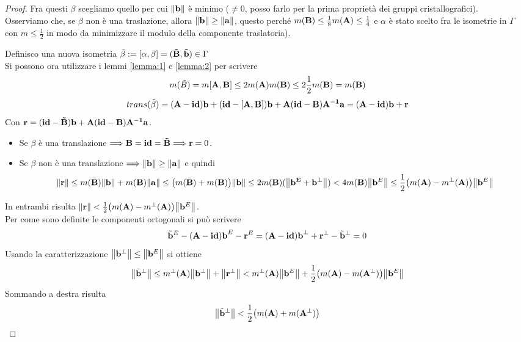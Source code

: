 \documentclass[a4paper,11pt,openright,twoside	]{book}
\begin{document}
\begin{proof}
Fra questi $\beta$ scegliamo quello per cui $\norm{\vb{b}}$ è minimo ($\neq 0$, posso farlo per la prima proprietà dei gruppi cristallografici). \\
Osserviamo che, se $\beta$ non è una traslazione, allora $ \norm{\vb{b}} \geq \norm{\vb{a}}$, questo perché $m(\vb{B}) \leq \frac{1}{8}m(\vb{A}) \leq \frac{1}{4}$ e $\alpha$ è stato scelto fra le isometrie in $\Gamma$ con $m \leq \frac{1}{2}$ in modo da minimizzare il modulo della componente traslatoria).  





Definisco una nuova isometria $ \tilde{\beta} := [\vb{\alpha,\beta}] = (\vb{\tilde{B}, \tilde{b}})\in \Gamma$  \\
Si possono ora utilizzare i lemmi \ref{lemma:1} e \ref{lemma:2} per scrivere 
\[ m(\tilde{B} ) = m[\vb{A,B}] \leq 2m(\vb{A}) m(\vb{B}) \leq 2 \frac{1}{2}m(\vb{B}) = m(\vb{B}) \]
\[ trans( \tilde{\beta}) = \vb{(A-id)b + (id-[A,B])b + A(id-B)A^{-1}a} = \vb{(A-id)b + r}\]
Con $\vb{r} = \vb{(id-\tilde{B})b + A(id-B)A^{-1}a}$.
\begin{itemize}
\item Se $\beta$  è una translazione $\Longrightarrow \vb{B = id = \tilde{B}} \Longrightarrow \vb{r} = 0$. 
\item Se $\beta$ non è una translazione $\Longrightarrow \norm{\vb{b}} \geq \norm{\vb{a}}$  e quindi \\
\[ \norm{\vb{r}} \leq m(\tilde{\vb{B}}) \norm{\vb{b}} + m(\vb{B}) \norm{\vb{a}} \leq \big( m(\tilde{\vb{B}}) + m(\vb{B}) \big) \norm{\vb{b}} \leq 2m(\vb{B})(\norm{\vb{b^{E}+ b^{\perp}}}) < 4 m(\vb{B}) \norm{\vb{b}^{E}} \leq \frac{1}{2} \big( m(\vb{A}) - m^{\perp}(\vb{A}) \big)\norm{\vb{b}^{E}} \]
\end{itemize}
In entrambi risulta $\norm{\vb{r}} < \frac{1}{2} \big( m(\vb{A}) - m^{\perp}(\vb{A}) \big)\norm{\vb{b}^{E}}$. \\
Per come sono definite le componenti ortogonali si può scrivere
\[ \tilde{\vb{b}}^{E} -(\vb{A-id) b}^{E} - \vb{r}^{E} = (\vb{A-id) b}^{\perp} + \vb{r}^{\perp} - \tilde{\vb{b}}^{\perp} = 0 \]
Usando la caratterizzazione $\norm{\vb{b}^{\perp}} \leq \norm{\vb{b}^E}$ si ottiene
\[ \norm{\tilde{\vb{b}}^{\perp}} \leq  m^{\perp}(\vb{A}) \norm{\vb{b}^{\perp}} + \norm{\vb{r}^{\perp}} < m^{\perp}(\vb{A}) \norm{\vb{b}^{E}} + \frac{1}{2} \big( m(\vb{A}) - m(\vb{A}^{\perp}) \big)\norm{\vb{b}^{E}}  \] 
Sommando a destra risulta
\[ \norm{\tilde{\vb{b}}^{\perp}} < \frac{1}{2} \big( m(\vb{A}) + m(\vb{A}^{\perp}) \big) \]

\end{proof}
\end{document}
